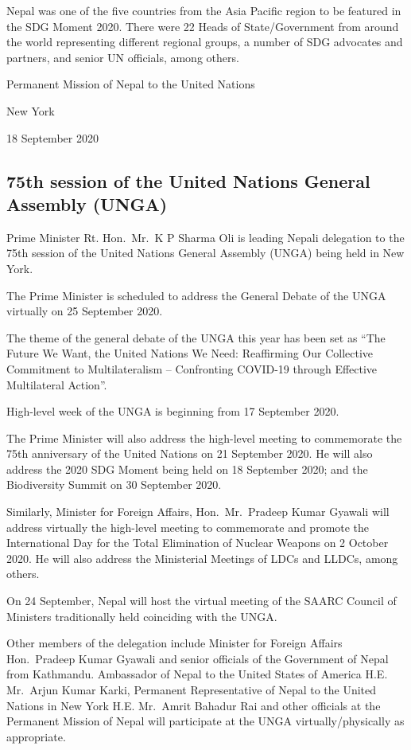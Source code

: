 \documentclass[
  openany]{book}
\begin{document}
Nepal was one of the five countries from the Asia Pacific region to be featured in the SDG Moment 2020. There were 22 Heads of State/Government from around the world representing different regional groups, a number of SDG advocates and partners, and senior UN officials, among others.

Permanent Mission of Nepal to the United Nations

New York

18 September 2020

\hypertarget{th-session-of-the-united-nations-general-assembly-unga}{%
\subsection{75th session of the United Nations General Assembly (UNGA)}\label{th-session-of-the-united-nations-general-assembly-unga}}

Prime Minister Rt. Hon.~Mr.~K P Sharma Oli is leading Nepali delegation to the 75th session of the United Nations General Assembly (UNGA) being held in New York.

The Prime Minister is scheduled to address the General Debate of the UNGA virtually on 25 September 2020.

The theme of the general debate of the UNGA this year has been set as ``The Future We Want, the United Nations We Need: Reaffirming Our Collective Commitment to Multilateralism -- Confronting COVID-19 through Effective Multilateral Action''.

High-level week of the UNGA is beginning from 17 September 2020.

The Prime Minister will also address the high-level meeting to commemorate the 75th anniversary of the United Nations on 21 September 2020. He will also address the 2020 SDG Moment being held on 18 September 2020; and the Biodiversity Summit on 30 September 2020.

Similarly, Minister for Foreign Affairs, Hon.~Mr.~Pradeep Kumar Gyawali will address virtually the high-level meeting to commemorate and promote the International Day for the Total Elimination of Nuclear Weapons on 2 October 2020. He will also address the Ministerial Meetings of LDCs and LLDCs, among others.

On 24 September, Nepal will host the virtual meeting of the SAARC Council of Ministers traditionally held coinciding with the UNGA.

Other members of the delegation include Minister for Foreign Affairs Hon.~Pradeep Kumar Gyawali and senior officials of the Government of Nepal from Kathmandu. Ambassador of Nepal to the United States of America H.E. Mr.~Arjun Kumar Karki, Permanent Representative of Nepal to the United Nations in New York H.E. Mr.~Amrit Bahadur Rai and other officials at the Permanent Mission of Nepal will participate at the UNGA virtually/physically as appropriate.
\end{document}
